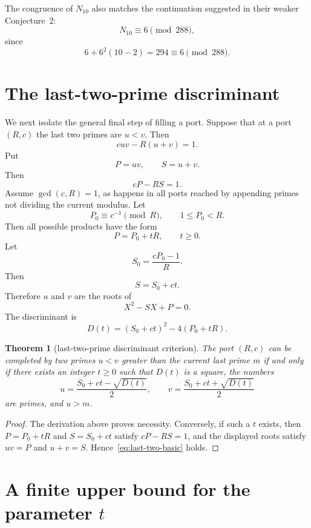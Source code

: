 \documentclass[11pt]{amsart}
\theoremstyle{plain}
\newtheorem{theorem}{Theorem}[section]
\theoremstyle{definition}
\theoremstyle{remark}
\begin{document}
The congruence of $N_{10}$ also matches the continuation suggested in their weaker Conjecture~2:
\[
        N_{10}\equiv6\pmod{288},
\]
since
\[
        6+6^2(10-2)=294\equiv6\pmod{288}.
\]

\section{The last-two-prime discriminant}

We next isolate the general final step of filling a port.
Suppose that at a port $(R,c)$ the last two primes are $u<v$.  Then
\begin{equation}\label{eq:last-two-basic}
        cuv-R(u+v)=1.
\end{equation}
Put
\[
        P=uv,
        \qquad
        S=u+v.
\]
Then
\[
        cP-RS=1.
\]
Assume $\gcd(c,R)=1$, as happens in all ports reached by appending primes not dividing the current modulus.  Let
\[
        P_0\equiv c^{-1}\pmod R,
        \qquad
        1\le P_0<R.
\]
Then all possible products have the form
\[
        P=P_0+tR,
        \qquad
        t\ge0.
\]
Let
\[
        S_0=\frac{cP_0-1}{R}.
\]
Then
\[
        S=S_0+ct.
\]
Therefore $u$ and $v$ are the roots of
\[
        X^2-SX+P=0.
\]
The discriminant is
\begin{equation}\label{eq:D-t}
        \boxed{D(t)=(S_0+ct)^2-4(P_0+tR).}
\end{equation}

\begin{theorem}[last-two-prime discriminant criterion]\label{thm:last-two-discriminant}
The port $(R,c)$ can be completed by two primes $u<v$ greater than the current last prime $m$ if and only if there exists an integer $t\ge0$ such that $D(t)$ is a square, the numbers
\[
        u=\frac{S_0+ct-\sqrt{D(t)}}2,
        \qquad
        v=\frac{S_0+ct+\sqrt{D(t)}}2
\]
are primes, and $u>m$.
\end{theorem}

\begin{proof}
The derivation above proves necessity.  Conversely, if such a $t$ exists, then $P=P_0+tR$ and $S=S_0+ct$ satisfy $cP-RS=1$, and the displayed roots satisfy $uv=P$ and $u+v=S$.  Hence~\eqref{eq:last-two-basic} holds.
\end{proof}

\section{A finite upper bound for the parameter \texorpdfstring{$t$}{t}}
\end{document}
